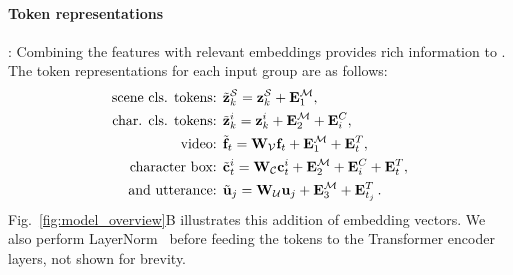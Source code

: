 \paragraph{Token representations}:
Combining the features with relevant embeddings provides rich information to \modelname.
The token representations for each input group are as follows:
\allowdisplaybreaks
\begin{align}
\text{scene cls. tokens: }
\label{eq:scene_cls_token}
& \tilde{\bz}_k^{\MS} = \bz_k^{\MS} + \bE^{\MM}_1, \\
\label{eq:char_cls_token}
\text{char. cls. tokens: }
& \tilde{\bz}_k^i = \bz_k^i + \bE^{\MM}_2 + \bE^C_i, \\
\label{eq:video_token}
\text{video: }
& \tilde{\bbf}_t = \bW_\MV \bbf_t + \bE^{\MM}_1 + \bE^T_t, \\
\label{eq:char_token}
\text{character box: }
& \tilde{\bc}_t^i = \bW_\MC \bc_t^i + \bE^{\MM}_2 + \bE^C_i + \bE^T_t, \\
\label{eq:utterance_token}
\text{and utterance: }
& \tilde{\bu}_j = \bW_\MU \bu_j + \bE^{\MM}_3 + \bE^T_{t_j} \, .
\end{align}
Fig.~\ref{fig:model_overview}B illustrates this addition of embedding vectors.
We also perform LayerNorm~\cite{layernorm} before feeding the tokens to the Transformer encoder layers, not shown for brevity.
